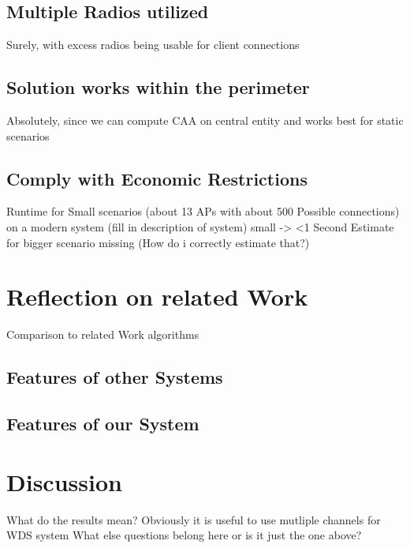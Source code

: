   \subsection{Multiple Radios utilized}
    Surely, with excess radios being usable for client connections \newline
  \subsection{Solution works within the perimeter}
    Absolutely, since we can compute CAA on central entity and works best for static scenarios \newline
  \subsection{Comply with Economic Restrictions}
    Runtime for Small scenarios (about 13 APs with about 500 Possible connections) on a modern system (fill in description of system) small -> <1 Second
    Estimate for bigger scenario missing (How do i correctly estimate that?)
\section{Reflection on related Work}
  Comparison to related Work algorithms\newline
  \subsection{Features of other Systems}
  \subsection{Features of our System}
\section{Discussion}
  What do the results mean? \newline
    Obviously it is useful to use mutliple channels for WDS system \newline
  What else questions belong here or is it just the one above?
